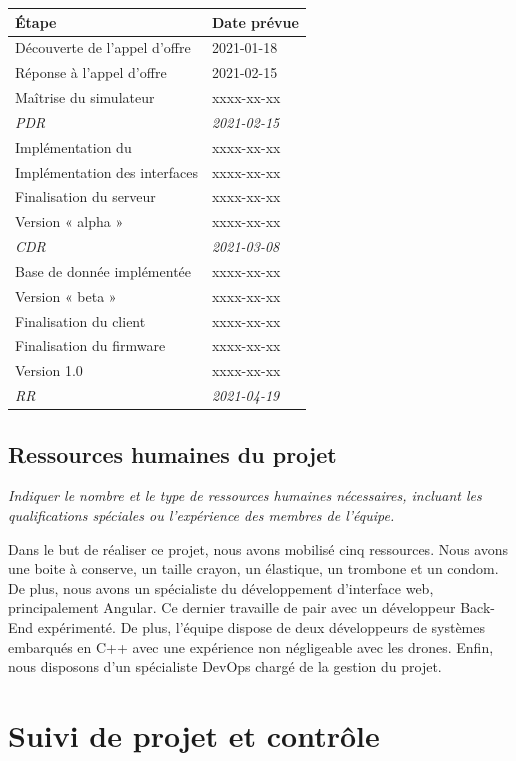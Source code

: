 \documentclass{mistcoursedoc}
\begin{document}
\begin{table}[h!]
  \centering
  \begin{tabular}{M{7cm} M{4cm}}
    \hline
    \textbf{Étape}                & \textbf{Date prévue} \tabularnewline
    \hline
    Découverte de l'appel d’offre & 2021-01-18 \tabularnewline
    Réponse à l’appel d'offre     & 2021-02-15 \tabularnewline
    Maîtrise du simulateur        & xxxx-xx-xx \tabularnewline
    \textit{PDR}                  & \textit{2021-02-15} \tabularnewline
    Implémentation du             & xxxx-xx-xx \tabularnewline
    Implémentation des interfaces & xxxx-xx-xx \tabularnewline
    Finalisation du serveur       & xxxx-xx-xx \tabularnewline
    Version « alpha »             & xxxx-xx-xx \tabularnewline
    \textit{CDR}                  & \textit{2021-03-08} \tabularnewline
    Base de donnée implémentée    & xxxx-xx-xx \tabularnewline
    Version « beta »              & xxxx-xx-xx \tabularnewline
    Finalisation du client        & xxxx-xx-xx \tabularnewline
    Finalisation du firmware      & xxxx-xx-xx \tabularnewline
    Version 1.0                   & xxxx-xx-xx \tabularnewline
    \textit{RR}                   & \textit{2021-04-19} \tabularnewline
    \hline
  \end{tabular}
\end{table}

\subsection{Ressources humaines du projet}

\textit{Indiquer le nombre et le type de ressources humaines nécessaires, incluant les qualifications spéciales ou l’expérience des membres de l’équipe.}

\par Dans le but de réaliser ce projet, nous avons mobilisé cinq ressources.
Nous avons une boite à conserve, un taille crayon, un élastique, un trombone et un condom.
De plus, nous avons un spécialiste du développement d’interface web, principalement Angular. Ce dernier travaille de pair avec un développeur Back-End expérimenté.
De plus, l’équipe dispose de deux développeurs de systèmes embarqués en C++ avec une expérience non négligeable avec les drones. Enfin, nous disposons d’un spécialiste DevOps chargé de la gestion du projet.

\section{Suivi de projet et contrôle}
\end{document}
